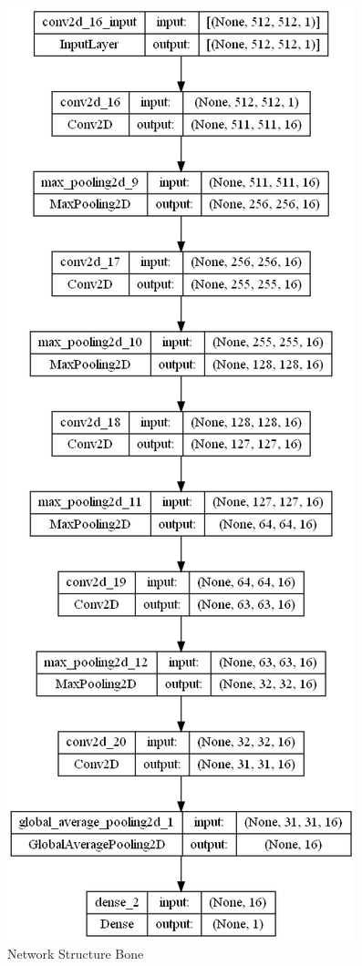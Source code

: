 \documentclass[
a4paper, 
12pt,
grayscalebody, %
abstract=on,
twoside, BCOR10mm, 12pt, DIV13,headinclude, footexclude, final, abstracton, openright
]{ibireprt}
\numberwithin{equation}{chapter}
\numberwithin{table}{chapter}
\numberwithin{figure}{chapter}
\numberwithin{algorithm}{chapter}
\numberwithin{example}{chapter}
\numberwithin{example}{chapter}
\begin{document}
\begin{figure}[h]	
	\center
	\includegraphics[width = 0.5 \textwidth]{walle_net_different.png}%
	\caption{Network Structure Bone}
	\label{fig:walle_net}
\end{figure}%
\end{document}
